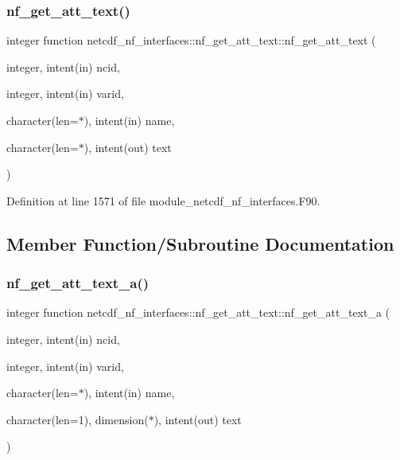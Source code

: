 \subsubsection{\texorpdfstring{nf\+\_\+get\+\_\+att\+\_\+text()}{nf\_get\_att\_text()}}
{\footnotesize\ttfamily integer function netcdf\+\_\+nf\+\_\+interfaces\+::nf\+\_\+get\+\_\+att\+\_\+text\+::nf\+\_\+get\+\_\+att\+\_\+text (\begin{DoxyParamCaption}\item[{integer, intent(in)}]{ncid,  }\item[{integer, intent(in)}]{varid,  }\item[{character(len=$\ast$), intent(in)}]{name,  }\item[{character(len=$\ast$), intent(out)}]{text }\end{DoxyParamCaption})}



Definition at line 1571 of file module\+\_\+netcdf\+\_\+nf\+\_\+interfaces.\+F90.



\subsection{Member Function/\+Subroutine Documentation}
\mbox{\label{interfacenetcdf__nf__interfaces_1_1nf__get__att__text_ad178cfb089fca708f3fd2847b0de4e9e}} 
\subsubsection{\texorpdfstring{nf\+\_\+get\+\_\+att\+\_\+text\+\_\+a()}{nf\_get\_att\_text\_a()}}
{\footnotesize\ttfamily integer function netcdf\+\_\+nf\+\_\+interfaces\+::nf\+\_\+get\+\_\+att\+\_\+text\+::nf\+\_\+get\+\_\+att\+\_\+text\+\_\+a (\begin{DoxyParamCaption}\item[{integer, intent(in)}]{ncid,  }\item[{integer, intent(in)}]{varid,  }\item[{character(len=$\ast$), intent(in)}]{name,  }\item[{character(len=1), dimension($\ast$), intent(out)}]{text }\end{DoxyParamCaption})}



